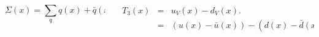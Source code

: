 \documentclass[10pt]{beamer}
\newcommand{\be}{\begin{equation*}}
\newcommand{\ee}{\end{equation*}}
\begin{document}
\begin{frame}
\begin{columns}
	\begin{column}{0.5\textwidth}
		\footnotesize{\be \Sigma(x) = \sum_q q(x)+\bar{q}(x) \ee}
	\end{column}

	\begin{column}{0.5\textwidth}
		\footnotesize{
\begin{eqnarray}
\nonumber T_3(x)&=&u_V(x) - d_V(x). \\
\nonumber  &=&\left( u(x) - \bar{u}(x)\right) - (d(x) - \bar{d}(x))
\end{eqnarray}
}

	\end{column}
\end{columns}




\end{frame}
\end{document}

